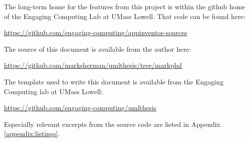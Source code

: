\noindent The long-term home for the features from this project is within the github home of the Engaging Computing Lab at UMass Lowell. That code can be found here:

\noindent \url{https://github.com/engaging-computing/appinventor-sources}

\noindent The source of this document is available from the author here:

\noindent \url{https://github.com/marksherman/umlthesis/tree/markphd}

\noindent The template used to write this document is available from the Engaging Computing lab at UMass Lowell:

\noindent \url{https://github.com/engaging-computing/umlthesis}

\noindent Especially relevant excerpts from the source code are listed in Appendix \ref{appendix:listings}.


